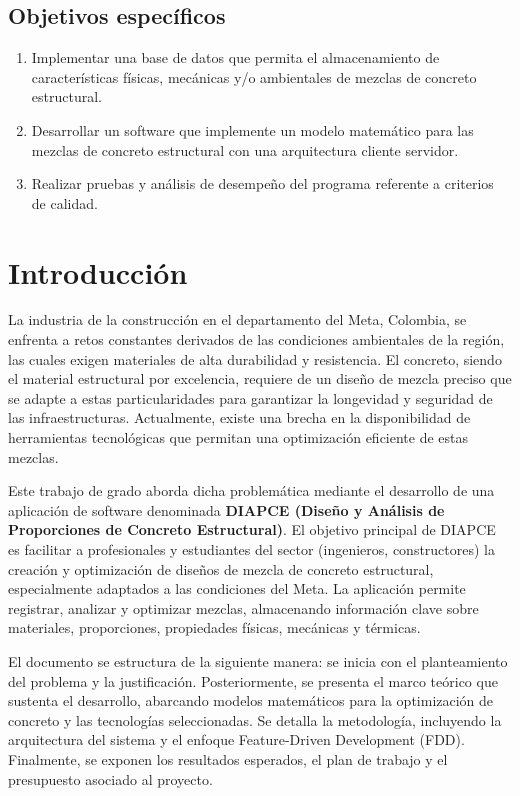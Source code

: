 \documentclass[12pt, letterpaper]{article}
\begin{document}
\subsection{Objetivos específicos}
\begin{enumerate}
    \item Implementar una base de datos que permita el almacenamiento de características físicas, mecánicas y/o ambientales de mezclas de concreto estructural.
    \item Desarrollar un software que implemente un modelo matemático para las mezclas de concreto estructural con una arquitectura cliente servidor.
    \item Realizar pruebas y análisis de desempeño del programa referente a criterios de calidad.
\end{enumerate}

\section{Introducción}
La industria de la construcción en el departamento del Meta, Colombia, se enfrenta a retos constantes derivados de las condiciones ambientales de la región, las cuales exigen materiales de alta durabilidad y resistencia. El concreto, siendo el material estructural por excelencia, requiere de un diseño de mezcla preciso que se adapte a estas particularidades para garantizar la longevidad y seguridad de las infraestructuras. Actualmente, existe una brecha en la disponibilidad de herramientas tecnológicas que permitan una optimización eficiente de estas mezclas.

Este trabajo de grado aborda dicha problemática mediante el desarrollo de una aplicación de software denominada \textbf{DIAPCE (Diseño y Análisis de Proporciones de Concreto Estructural)}. El objetivo principal de DIAPCE es facilitar a profesionales y estudiantes del sector (ingenieros, constructores) la creación y optimización de diseños de mezcla de concreto estructural, especialmente adaptados a las condiciones del Meta. La aplicación permite registrar, analizar y optimizar mezclas, almacenando información clave sobre materiales, proporciones, propiedades físicas, mecánicas y térmicas.

El documento se estructura de la siguiente manera: se inicia con el planteamiento del problema y la justificación. Posteriormente, se presenta el marco teórico que sustenta el desarrollo, abarcando modelos matemáticos para la optimización de concreto y las tecnologías seleccionadas. Se detalla la metodología, incluyendo la arquitectura del sistema y el enfoque Feature-Driven Development (FDD). Finalmente, se exponen los resultados esperados, el plan de trabajo y el presupuesto asociado al proyecto.
\end{document}

